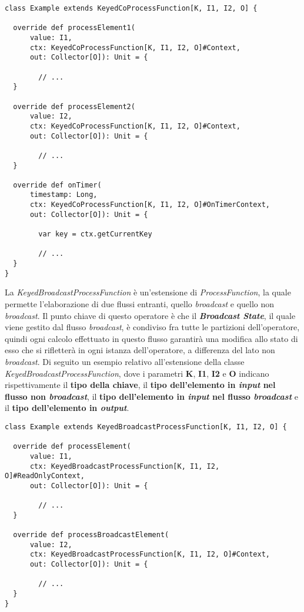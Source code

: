 \begin{verbatim}
class Example extends KeyedCoProcessFunction[K, I1, I2, O] {

  override def processElement1(
      value: I1, 
      ctx: KeyedCoProcessFunction[K, I1, I2, O]#Context, 
      out: Collector[O]): Unit = {
      
      	// ...
  }
  
  override def processElement2(
      value: I2, 
      ctx: KeyedCoProcessFunction[K, I1, I2, O]#Context, 
      out: Collector[O]): Unit = {
      
      	// ...
  }

  override def onTimer(
      timestamp: Long, 
      ctx: KeyedCoProcessFunction[K, I1, I2, O]#OnTimerContext, 
      out: Collector[O]): Unit = {
      
      	var key = ctx.getCurrentKey
      
      	// ...
  }
}
\end{verbatim}
La \textit{KeyedBroadcastProcessFunction} è un'estensione di \textit{ProcessFunction}, la quale permette l'elaborazione di due flussi entranti, quello \textit{broadcast} e quello non \textit{broadcast}. Il punto chiave di questo operatore è che il \textbf{\textit{Broadcast State}}, il quale viene gestito dal flusso \textit{broadcast}, è condiviso fra tutte le partizioni dell'operatore, quindi ogni calcolo effettuato in questo flusso garantirà una modifica allo stato di esso che si rifletterà in ogni istanza dell'operatore, a differenza del lato non \textit{broadcast}. Di seguito un esempio relativo all'estensione della classe \textit{KeyedBroadcastProcessFunction}, dove i parametri \textbf{K}, \textbf{I1}, \textbf{I2} e \textbf{O} indicano rispettivamente il \textbf{tipo della chiave}, il \textbf{tipo dell'elemento in \textit{input} nel flusso non \textit{broadcast}}, il \textbf{tipo dell'elemento in \textit{input} nel flusso \textit{broadcast}} e il \textbf{tipo dell'elemento in \textit{output}}.
\begin{verbatim}
class Example extends KeyedBroadcastProcessFunction[K, I1, I2, O] {

  override def processElement(
      value: I1, 
      ctx: KeyedBroadcastProcessFunction[K, I1, I2, O]#ReadOnlyContext, 
      out: Collector[O]): Unit = {
      
      	// ...
  }
  
  override def processBroadcastElement(
      value: I2, 
      ctx: KeyedBroadcastProcessFunction[K, I1, I2, O]#Context, 
      out: Collector[O]): Unit = {
      
      	// ...
  }
}
\end{verbatim}

